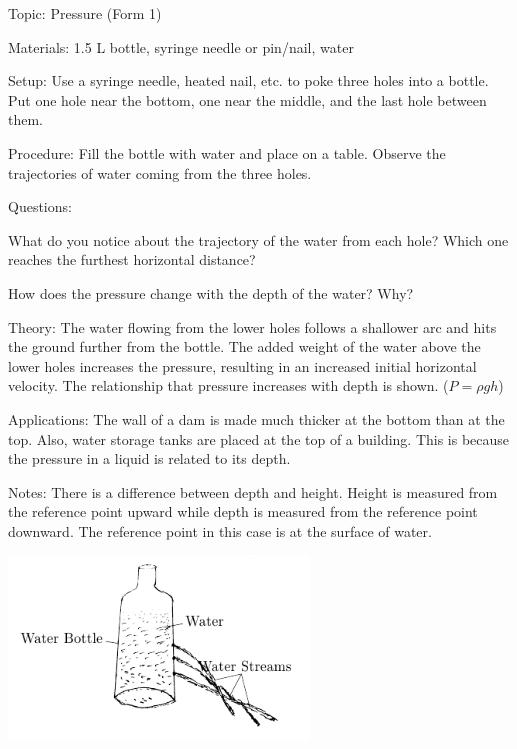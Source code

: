 \begin{description*}
\item[Topic:]{Pressure (Form 1)}
\item[Materials:]{1.5 L bottle, syringe needle or pin/nail, water}
\item[Setup:]{Use a syringe needle, heated nail, etc. to poke three holes into a bottle. Put one hole near
the bottom, one near the middle, and the last hole between them.}
\item[Procedure:]{Fill the bottle with water and place on a table. Observe the trajectories of water coming from the three holes.}
\item[Questions:]{}\hfill
\begin{enumerate*}
\item What do you notice about the trajectory of the water from each hole? Which one reaches the furthest horizontal distance?
\item How does the pressure change with the depth of the water? Why?
\end{enumerate*}
\item[Theory:]{The water flowing from the lower holes follows a shallower arc and hits the ground further from the bottle. The added weight of the water above the lower holes increases the pressure, resulting in an increased initial horizontal velocity. The relationship that pressure increases with depth is shown. ($P = \rho g h$)}
\item[Applications:]{The wall of a dam is made much thicker at the bottom than at the top. Also, water storage tanks are placed at the top of a building. This is because the pressure in a liquid is related to its depth.}
\item[Notes:]{There is a difference between depth and height. Height is measured from the reference point upward while depth is measured from the reference point downward. The reference point in this case is at the surface of water.}
\end{description*}

\begin{center}
\includegraphics[width=8cm]{./img/pressure-liquid-alt.png}
\end{center}

%




